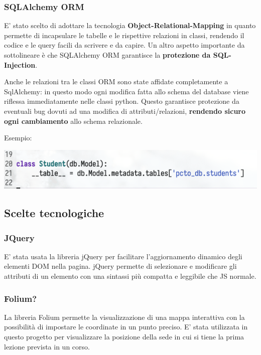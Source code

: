 \documentclass[11pt]{article}
\begin{document}
\subsubsection{SQLAlchemy ORM}
\label{sec:org4a207cb}

E' stato scelto di adottare la tecnologia \textbf{Object-Relational-Mapping} in quanto permette di incapsulare le tabelle e le rispettive relazioni in classi, rendendo il codice e le query facili da scrivere e da capire. Un altro aspetto importante da sottolineare è che SQLAlchemy ORM garantisce la \textbf{protezione da SQL-Injection}.

Anche le relazioni tra le classi ORM sono state affidate completamente a SqlAlchemy: in questo modo ogni modifica fatta allo schema del database viene riflessa immediatamente nelle classi python. Questo garantisce protezione da eventuali bug dovuti ad una modifica di attributi/relazioni, \textbf{rendendo sicuro ogni cambiamento} allo schema relazionale.

Esempio:

\begin{center}
\includegraphics[width=.9\linewidth]{./resources/orm.png}
\end{center}

\subsection{Scelte tecnologiche}
\label{sec:org791a073}

\subsubsection{JQuery}
\label{sec:orgbef60fe}
E' stata usata la libreria jQuery per facilitare l'aggiornamento dinamico degli elementi DOM nella pagina. jQuery permette di selezionare e modificare gli attributi di un elemento con una sintassi più compatta e leggibile che JS normale.

\subsubsection{Folium?}
\label{sec:orgf806284}
La libreria Folium permette la visualizzazione di una mappa interattiva con la possibilità di impostare le coordinate in un punto preciso. E' stata utilizzata in questo progetto per visualizzare la posizione della sede in cui si tiene la prima lezione prevista in un corso.
\end{document}
